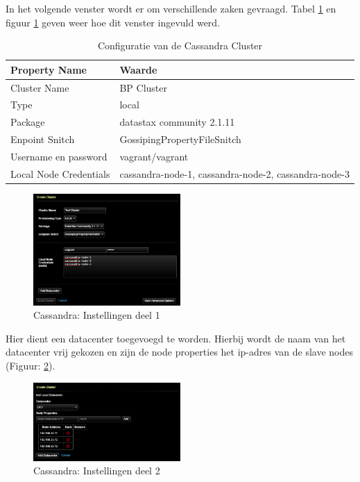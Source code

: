 In het volgende venster wordt er om verschillende zaken gevraagd.
Tabel \ref{tab:cas_conf} en figuur \ref{fig:cas_conf_1} geven weer hoe dit venster ingevuld werd.

\begin{table}[H]
  \begin{tabular}{|l|l|}
  \hline
  Property Name & Waarde \\
  \hline
  \hline
  Cluster Name & BP Cluster \\
  \hline
  Type & local \\
  \hline
  Package & datastax community 2.1.11 \\
  \hline
  Enpoint Snitch & GossipingPropertyFileSnitch \\
  \hline
  Username en password & vagrant/vagrant\\
  \hline
  Local Node Credentials & cassandra-node-1, cassandra-node-2, cassandra-node-3 \\
  \hline
  \end{tabular}
  \caption{Configuratie van de Cassandra Cluster}
  \label{tab:cas_conf}
\end{table}

\begin{figure}[H]
  	\centering
    \includegraphics[width=0.5\textwidth]{img/4_installatie_cassandra/1_Configuration_part_1}
    \caption{Cassandra: Instellingen deel 1}
    \label{fig:cas_conf_1}
\end{figure}

Hier dient een datacenter toegevoegd te worden.
Hierbij wordt de naam van het datacenter vrij gekozen en zijn de node properties het ip-adres van de slave nodes (Figuur: \ref{fig:cas_conf_2}).

\begin{figure}[H]
  	\centering
    \includegraphics[width=0.5\textwidth]{img/4_installatie_cassandra/1_Configuration_part_2}
    \caption{Cassandra: Instellingen deel 2}
    \label{fig:cas_conf_2}
\end{figure}

